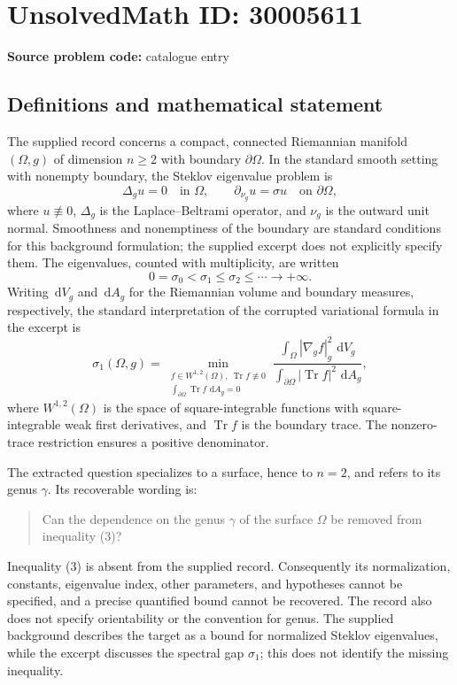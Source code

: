 \documentclass[11pt]{article}
\newcommand{\dd}{\,\mathrm{d}}
\begin{document}
\section*{UnsolvedMath ID: 30005611}
\textbf{Source problem code:} catalogue entry
\subsection{Definitions and mathematical statement}
The supplied record concerns a compact, connected Riemannian manifold $(\Omega,g)$ of dimension $n\geq 2$ with boundary $\partial\Omega$. In the standard smooth setting with nonempty boundary, the Steklov eigenvalue problem is
\[
\Delta_g u=0\quad\text{in }\Omega,\qquad
\partial_{\nu_g}u=\sigma u\quad\text{on }\partial\Omega,
\]
where $u\not\equiv0$, $\Delta_g$ is the Laplace--Beltrami operator, and $\nu_g$ is the outward unit normal. Smoothness and nonemptiness of the boundary are standard conditions for this background formulation; the supplied excerpt does not explicitly specify them. The eigenvalues, counted with multiplicity, are written
\[
0=\sigma_0<\sigma_1\leq\sigma_2\leq\cdots\longrightarrow+\infty.
\]
Writing $\dd V_g$ and $\dd A_g$ for the Riemannian volume and boundary measures, respectively, the standard interpretation of the corrupted variational formula in the excerpt is
\[
\sigma_1(\Omega,g)=
\min_{\substack{f\in W^{1,2}(\Omega),\ \operatorname{Tr}f\not\equiv0\\
\int_{\partial\Omega}\operatorname{Tr}f\,\dd A_g=0}}
\frac{\displaystyle\int_\Omega |\nabla_g f|_g^2\,\dd V_g}
{\displaystyle\int_{\partial\Omega}|\operatorname{Tr}f|^2\,\dd A_g},
\]
where $W^{1,2}(\Omega)$ is the space of square-integrable functions with square-integrable weak first derivatives, and $\operatorname{Tr}f$ is the boundary trace. The nonzero-trace restriction ensures a positive denominator.

The extracted question specializes to a surface, hence to $n=2$, and refers to its genus $\gamma$. Its recoverable wording is:
\begin{quote}
Can the dependence on the genus $\gamma$ of the surface $\Omega$ be removed from inequality (3)?
\end{quote}
Inequality (3) is absent from the supplied record. Consequently its normalization, constants, eigenvalue index, other parameters, and hypotheses cannot be specified, and a precise quantified bound cannot be recovered. The record also does not specify orientability or the convention for genus. The supplied background describes the target as a bound for normalized Steklov eigenvalues, while the excerpt discusses the spectral gap $\sigma_1$; this does not identify the missing inequality.
\end{document}
